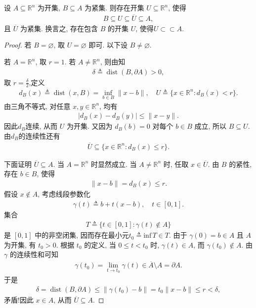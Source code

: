 \documentclass[../../main.tex]{subfiles}
\begin{document}
\begin{proposition}\label{proposition:紧集的相对紧开邻域}
设 $A\subseteq\mathbb{R}^n$ 为开集, $B\subseteq A$ 为紧集. 则存在开集 $U\subseteq\mathbb{R}^n$, 使得
\begin{align*}
B\subseteq U\subseteq\overline{U}\subseteq A,
\end{align*}
且 $\overline{U}$ 为紧集. 换言之, 存在包含 $B$ 的开集 $U$, 使得$U\subset \subset A$.
\end{proposition}
\begin{proof}

若 $B=\varnothing$, 取 $U=\varnothing$ 即可. 以下设 $B\neq\varnothing$.

若 $A=\mathbb{R}^n$, 取 $r=1$. 若 $A\neq\mathbb{R}^n$, 则由知
\begin{align*}
\delta\triangleq\operatorname{dist}(B,\partial A)>0,
\end{align*}
取 $r=\frac{\delta}{2}$,定义
\begin{align*}
d_B(x)\triangleq\operatorname{dist}(x,B)
=\inf\limits_{b\in B}\|x-b\|,\quad
U\triangleq\{x\in\mathbb{R}^n:d_B(x)<r\}.
\end{align*}
由三角不等式, 对任意 $x,y\in\mathbb{R}^n$, 均有
\begin{align*}
|d_B(x)-d_B(y)|\leqslant\|x-y\|.
\end{align*}
因此$d_B$连续, 从而 $U$ 为开集. 又因为 $d_B(b)=0$ 对每个 $b\in B$ 成立, 所以 $B\subseteq U$. 由$d_B$的连续性还有
\begin{align*}
\overline{U}\subseteq\{x\in\mathbb{R}^n:d_B(x)\leqslant r\}.
\end{align*}

下面证明 $\overline{U}\subseteq A$. 当 $A=\mathbb{R}^n$ 时显然成立. 当 $A\neq\mathbb{R}^n$ 时, 任取 $x\in\overline{U}$. 由 $B$ 的紧性, 存在 $b\in B$, 使得
\begin{align*}
\|x-b\|=d_B(x)\leqslant r.
\end{align*}
假设 $x\notin A$, 考虑线段参数化
\begin{align*}
\gamma(t)\triangleq b+t(x-b),\quad t\in[0,1].
\end{align*}
集合
\begin{align*}
T\triangleq\{t\in[0,1]:\gamma(t)\notin A\}
\end{align*}
是 $[0,1]$ 中的非空闭集, 因而存在最小元$t_0\triangleq \mathrm{inf}\,T\in T$. 由于 $\gamma(0)=b\in A$ 且 $A$ 为开集, 有 $t_0>0$. 根据 $t_0$ 的定义, 当 $0\leqslant t<t_0$ 时, $\gamma(t)\in A$, 而 $\gamma(t_0)\notin A$. 由 $\gamma$ 的连续性和可知
\begin{align*}
\gamma(t_0)=\lim_{t\to t_0}\gamma(t)\in\overline{A}\setminus A=\partial A.
\end{align*}
于是
\begin{align*}
\delta
=\operatorname{dist}(B,\partial A)
\leqslant\|\gamma(t_0)-b\|=t_0\|x-b\|
\leqslant r
<\delta,
\end{align*}
矛盾!因此 $x\in A$, 从而 $\overline{U}\subseteq A$.


\end{proof}
\end{document}
